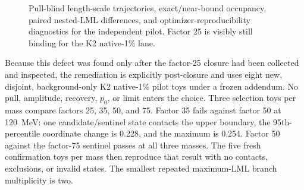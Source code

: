 \begin{figure}[htbp]
\centering
{}
\caption{Pull-blind length-scale
trajectories, exact/near-bound occupancy, paired nested-LML differences, and
optimizer-reproducibility diagnostics for the independent pilot.  Factor 25
is visibly still binding for the K2 native-1\% lane.}
\label{fig:v4p8p3-length-pilot}
\end{figure}

Because this defect was found only after the factor-25 closure had been
collected and inspected, the remediation is explicitly post-closure and uses
eight new, disjoint, background-only K2 native-1\% pilot toys under a frozen
addendum.  No pull, amplitude, recovery, $p_0$, or limit enters the choice.
Three selection toys per mass compare factors 25, 35, 50, and 75.  Factor 35
fails against factor 50 at 120~MeV: one candidate/sentinel state contacts the
upper boundary, the 95th-percentile coordinate change is 0.228, and the
maximum is 0.254.  Factor 50 against the factor-75 sentinel passes at all three
masses.  The five fresh confirmation toys per mass then reproduce that result
with no contacts, exclusions, or invalid states.  The smallest repeated
maximum-LML branch multiplicity is two.

\begin{table}[htbp]
\centering
\caption{Targeted ceiling remediation for K2 native 1\%.  Entries are the
worst values over 65, 120, and 210~MeV.  The coordinate column gives the
median, 95th percentile, and maximum of
$|\Delta\ell|/\sigma_x$.  ``Contacts'' counts candidate and sentinel states
together.}
\label{tab:v4p8p3-ceiling-remediation}
\end{table}

